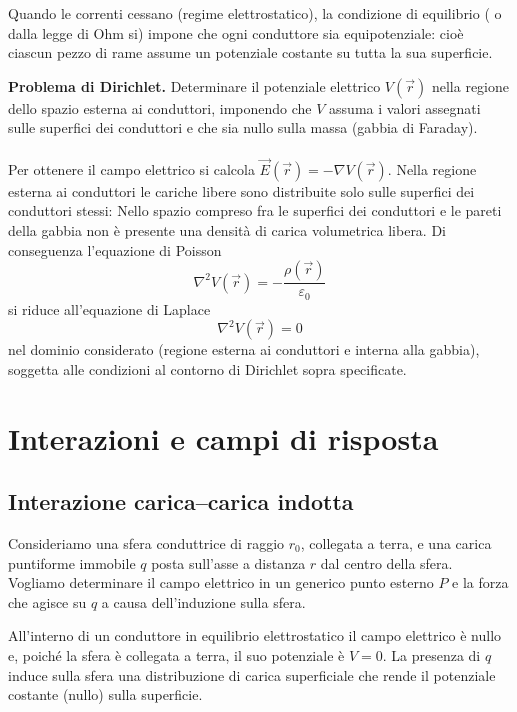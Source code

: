 \documentclass{book}
\begin{document}
Quando le correnti cessano (regime elettrostatico), la condizione di equilibrio ( o dalla legge di Ohm si) impone che ogni conduttore sia equipotenziale: cioè ciascun pezzo di rame assume un potenziale costante su tutta la sua superficie.

\medskip

\noindent\textbf{Problema di Dirichlet.} Determinare il potenziale elettrico \(V(\vec r)\) nella regione dello spazio esterna ai conduttori, imponendo che \(V\) assuma i valori assegnati sulle superfici dei conduttori e che sia nullo sulla massa (gabbia di Faraday).
\\
\\
Per ottenere il campo elettrico si calcola \(\vec{E}(\vec r)=-\nabla V(\vec r)\). Nella regione esterna ai conduttori le cariche libere sono distribuite solo sulle superfici dei conduttori stessi: Nello spazio compreso fra le superfici dei conduttori e le pareti della gabbia non è presente una densità di carica volumetrica libera. Di conseguenza l'equazione di Poisson
\[
\nabla^2 V(\vec r) = -\frac{\rho(\vec r)}{\varepsilon_0}
\]
si riduce all'equazione di Laplace
\[
\nabla^2 V(\vec r)=0
\]
nel dominio considerato (regione esterna ai conduttori e interna alla gabbia), soggetta alle condizioni al contorno di Dirichlet sopra specificate.


\chapter{Interazioni e campi di risposta}
\section{Interazione carica--carica indotta}


Consideriamo una sfera conduttrice di raggio $r_0$, collegata a terra, e una carica puntiforme immobile $q$ posta sull'asse a distanza $r$ dal centro della sfera. Vogliamo determinare il campo elettrico in un generico punto esterno $P$ e la forza che agisce su $q$ a causa dell'induzione sulla sfera.

All'interno di un conduttore in equilibrio elettrostatico il campo elettrico è nullo e, poiché la sfera è collegata a terra, il suo potenziale è $V=0$. La presenza di $q$ induce sulla sfera una distribuzione di carica superficiale che rende il potenziale costante (nullo) sulla superficie.
\end{document}

